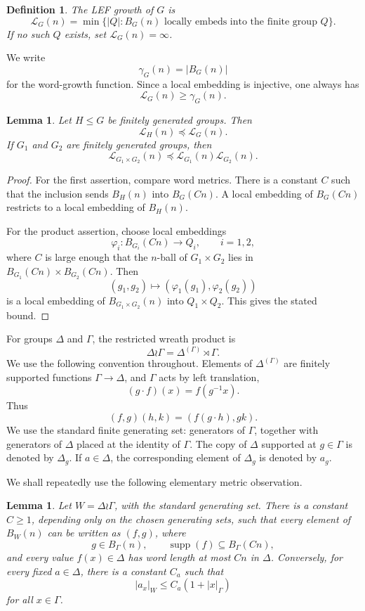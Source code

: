 \documentclass[11pt]{article}
\newcommand{\LEF}{\mathcal L}
\newcommand{\supp}{\operatorname{supp}}
\newtheorem{lemma}[theorem]{Lemma}
\newtheorem{definition}[theorem]{Definition}
\begin{document}
\begin{definition}
The LEF growth of \(G\) is
\[
\LEF_G(n)=\min\{|Q|:B_G(n)\text{ locally embeds into the finite group }Q\}.
\]
If no such \(Q\) exists, set \(\LEF_G(n)=\infty\).
\end{definition}

We write
\[
\gamma_G(n)=|B_G(n)|
\]
for the word-growth function. Since a local embedding is injective, one always has
\[
\LEF_G(n)\ge \gamma_G(n).
\]

\begin{lemma}
Let \(H\le G\) be finitely generated groups. Then
\[
\LEF_H(n)\preceq \LEF_G(n).
\]
If \(G_1\) and \(G_2\) are finitely generated groups, then
\[
\LEF_{G_1\times G_2}(n)\preceq \LEF_{G_1}(n)\LEF_{G_2}(n).
\]
\end{lemma}

\begin{proof}
For the first assertion, compare word metrics. There is a constant \(C\) such that the inclusion sends \(B_H(n)\) into \(B_G(Cn)\). A local embedding of \(B_G(Cn)\) restricts to a local embedding of \(B_H(n)\).

For the product assertion, choose local embeddings
\[
\varphi_i:B_{G_i}(Cn)\to Q_i,\qquad i=1,2,
\]
where \(C\) is large enough that the \(n\)-ball of \(G_1\times G_2\) lies in \(B_{G_1}(Cn)\times B_{G_2}(Cn)\). Then
\[
(g_1,g_2)\mapsto(\varphi_1(g_1),\varphi_2(g_2))
\]
is a local embedding of \(B_{G_1\times G_2}(n)\) into \(Q_1\times Q_2\). This gives the stated bound.
\end{proof}

For groups \(\Delta\) and \(\Gamma\), the restricted wreath product is
\[
\Delta\wr\Gamma=\Delta^{(\Gamma)}\rtimes\Gamma.
\]
We use the following convention throughout. Elements of \(\Delta^{(\Gamma)}\) are finitely supported functions \(\Gamma\to\Delta\), and \(\Gamma\) acts by left translation,
\[
(g\cdot f)(x)=f(g^{-1}x).
\]
Thus
\[
(f,g)(h,k)=(f(g\cdot h),gk).
\]
We use the standard finite generating set: generators of \(\Gamma\), together with generators of \(\Delta\) placed at the identity of \(\Gamma\). The copy of \(\Delta\) supported at \(g\in\Gamma\) is denoted by \(\Delta_g\). If \(a\in\Delta\), the corresponding element of \(\Delta_g\) is denoted by \(a_g\).

We shall repeatedly use the following elementary metric observation.

\begin{lemma}
Let \(W=\Delta\wr\Gamma\), with the standard generating set. There is a constant \(C\ge 1\), depending only on the chosen generating sets, such that every element of \(B_W(n)\) can be written as \((f,g)\), where
\[
g\in B_\Gamma(n),\qquad \supp(f)\subseteq B_\Gamma(Cn),
\]
and every value \(f(x)\in\Delta\) has word length at most \(Cn\) in \(\Delta\). Conversely, for every fixed \(a\in\Delta\), there is a constant \(C_a\) such that
\[
|a_x|_W\le C_a(1+|x|_\Gamma)
\]
for all \(x\in\Gamma\).
\end{lemma}
\end{document}
